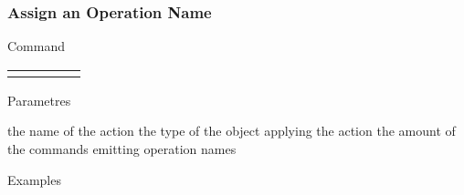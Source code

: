 \documentclass[10pt]{beamer}
\begin{document}
\begin{frame}[t] \frametitle{Assign an Operation Name}

	\begin{block}{Command} 
		\begin{tabularx}{\textwidth}{@{}l@{}l@{}l@{}l@{}R}
			 &
				 &
				 &
				 & \InstrItem
		\end{tabularx}
	\end{block}

	\begin{block}{Parametres} \begin{itemize}
		 the name of the action
		 the type of the object applying the action
		 the amount of the commands emitting operation names
	\end{itemize} \end{block}

	\begin{block}{Examples}
	\end{block}

\end{frame}
\end{document}
